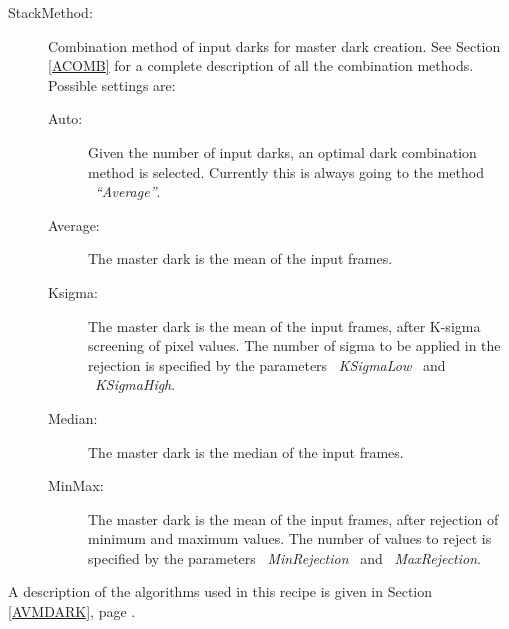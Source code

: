 \begin{description}
\item [StackMethod:]  Combination method of input darks for master dark 
                      creation. See Section \ref{ACOMB} for a complete 
                      description of all the combination methods. Possible 
                      settings are:

\begin{description}

  \item [Auto:]     Given the number of input darks, an optimal dark
                    combination method is selected. Currently this is
                    always going to the method \ {\it ``Average''}.

  \item [Average:]  The master dark is the mean of the input frames.

  \item [Ksigma:]   The master dark is the mean of the input frames, after
                    K-sigma screening of pixel values. The number of sigma 
                    to be applied in the rejection is specified by the 
                    parameters \ {\it KSigmaLow} \ and \ {\it KSigmaHigh}.

  \item [Median:]   The master dark is the median of the input frames.

  \item [MinMax:]   The master dark is the mean of the input frames, after
                    rejection of minimum and maximum values.
                    The number of values to reject is specified by the 
                    parameters \ {\it MinRejection} \ and \ {\it MaxRejection}.

\end{description}


\end{description}

A description of the algorithms used in this recipe is given in Section
\ref{AVMDARK}, page \pageref{AVMDARK}.


